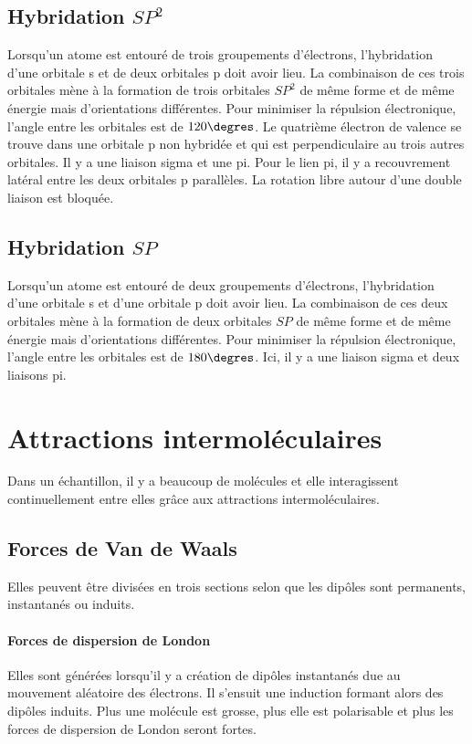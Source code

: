 \subsection{Hybridation $SP^2$}
Lorsqu'un atome est entouré de trois groupements d'électrons, l'hybridation d'une orbitale s et de deux orbitales p doit avoir lieu.
La combinaison de ces trois orbitales mène à la formation de trois orbitales $SP^2$ de même forme et de même énergie mais d'orientations différentes.
Pour minimiser la répulsion électronique, l'angle entre les orbitales est de $120\degres$.
Le quatrième électron de valence se trouve dans une orbitale p non hybridée et qui est perpendiculaire au trois autres orbitales.
Il y a une liaison sigma et une pi.
Pour le lien pi, il y a recouvrement latéral entre les deux orbitales p parallèles.
La rotation libre autour d'une double liaison est bloquée.

\subsection{Hybridation $SP$}
Lorsqu'un atome est entouré de deux groupements d'électrons, l'hybridation d'une orbitale s et d'une orbitale p doit avoir lieu.
La combinaison de ces deux orbitales mène à la formation de deux orbitales $SP$ de même forme et de même énergie mais d'orientations différentes.
Pour minimiser la répulsion électronique, l'angle entre les orbitales est de $180\degres$.
Ici, il y a une liaison sigma et deux liaisons pi.

\section{Attractions intermoléculaires}
Dans un échantillon, il y a beaucoup de molécules et elle interagissent continuellement entre elles grâce aux attractions intermoléculaires.

\subsection{Forces de Van de Waals}Elles peuvent être divisées en trois sections selon que les dipôles sont permanents, instantanés ou induits.

\paragraph{Forces de dispersion de London}
Elles sont générées lorsqu'il y a création de dipôles instantanés due au mouvement aléatoire des électrons.
Il s'ensuit une induction formant alors des dipôles induits.
Plus une molécule est grosse, plus elle est polarisable et plus les forces de dispersion de London seront fortes.
